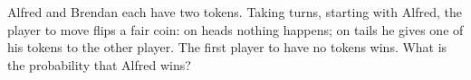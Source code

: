 Alfred and Brendan each have two tokens. Taking turns, starting with Alfred, the player to move flips a fair coin: on heads nothing happens; on tails he gives one of his tokens to the other player. The first player to have no tokens wins. What is the probability that Alfred wins?
